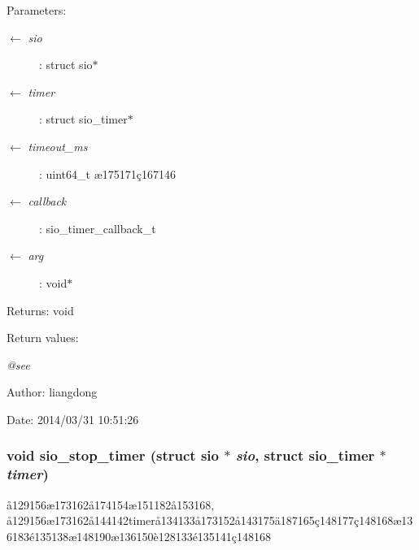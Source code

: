 \begin{Desc}
\item[Parameters:]
\begin{description}
\item[\mbox{$\leftarrow$} {\em sio}]: struct sio$\ast$ \item[\mbox{$\leftarrow$} {\em timer}]: struct sio\_\-timer$\ast$ \item[\mbox{$\leftarrow$} {\em timeout\_\-ms}]: uint64\_\-t \ae{}175171\c{c}167146 \item[\mbox{$\leftarrow$} {\em callback}]: sio\_\-timer\_\-callback\_\-t \item[\mbox{$\leftarrow$} {\em arg}]: void$\ast$ \end{description}
\end{Desc}
\begin{Desc}
\item[Returns:]void \end{Desc}
\begin{Desc}
\item[Return values:]
\begin{description}
\item[{\em @see}]\end{description}
\end{Desc}
\begin{Desc}
\item[Author:]liangdong \end{Desc}
\begin{Desc}
\item[Date:]2014/03/31 10:51:26 \end{Desc}
\subsubsection{\setlength{\rightskip}{0pt plus 5cm}void sio\_\-stop\_\-timer (struct sio $\ast$ {\em sio}, struct sio\_\-timer $\ast$ {\em timer})}\label{sio_8c_a15}


\aa{}129156\ae{}173162\aa{}174154\ae{}151182\aa{}153168, \aa{}129156\ae{}173162\aa{}144142timer\aa{}134133\aa{}173152\aa{}143175\"{a}187165\c{c}148177\c{c}148168\ae{}136183\'{e}135138\ae{}148190\ae{}136150\`{e}128133\'{e}135141\c{c}148168 

